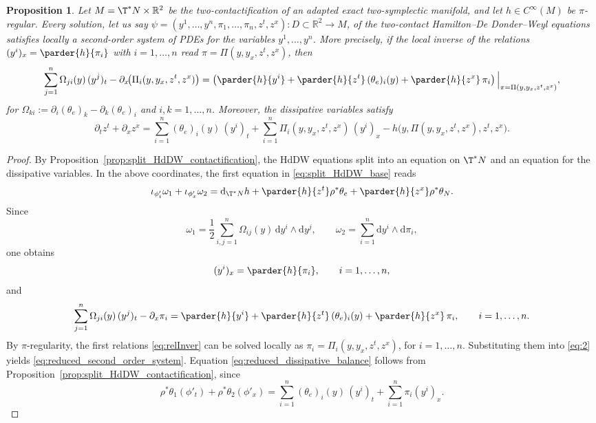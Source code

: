 \documentclass[11pt,a4paper]{article}
\newcommand{\dd}{\mathrm{d}}
\theoremstyle{plain} \newtheorem{theorem}{Theorem}[section] \newtheorem{proposition}[theorem]{Proposition} \newtheorem{corollary}[theorem]{Corollary} \newtheorem{lemma}[theorem]{Lemma} \theoremstyle{definition} \newtheorem{definition}[theorem]{Definition} \theoremstyle{remark} \newtheorem{remark}[theorem]{Remark} \newtheorem{example}[theorem]{Example} %
\begin{document}
\begin{proposition}\label{prop:reduced_second_order_equations}
Let \(M=\T^*N\times\mathbb R^2\) be the two-contactification of an adapted exact two-symplectic manifold, and let \(h\in C^\infty(M)\) be \(\pi\)-regular. Every solution, let us say \(\psi=(y^1,\dots,y^n,\pi_1,\dots,\pi_n,z^t,z^x):D\subset\mathbb R^2\to M\), of the two-contact Hamilton--De Donder--Weyl equations satisfies locally a second-order system of PDEs for the variables \(y^1,\dots,y^n\). More precisely, if the local inverse of the relations \((y^i)_x=\parder{h}{\pi_i}\) with \(i=1,\dots,n\) read \(\pi=\Pi(y,y_x,z^t,z^x)\), then
\begin{equation}\label{eq:reduced_second_order_system}
\sum_{j=1}^n \Omega_{ji}(y)\,(y^j)_t-\partial_x\!\bigl(\Pi_i(y,y_x,z^t,z^x)\bigr)=\left(\parder{h}{y^i}+\parder{h}{z^t}\,(\theta_e)_i(y)+\parder{h}{z^x}\,\pi_i\right)\Big|_{\pi=\Pi(y,y_x,z^t,z^x)},
\end{equation}
for  \(\Omega_{ki}:=\partial_i(\theta_e)_k-\partial_k(\theta_e)_i\) and $i,k=1,\dots,n$. Moreover, the dissipative variables satisfy
\begin{equation}\label{eq:reduced_dissipative_balance}
\partial_t z^t+\partial_x z^x=\sum_{i=1}^n (\theta_e)_i(y)\,(y^i)_t+\sum_{i=1}^n \Pi_i(y,y_x,z^t,z^x)\,(y^i)_x-h\bigl(y,\Pi(y,y_x,z^t,z^x),z^t,z^x\bigr).
\end{equation}
\end{proposition}

\begin{proof}
By Proposition~\ref{prop:split_HdDW_contactification}, the HdDW equations split into an equation on \(\T^*N\) and an equation for the dissipative variables. In the above coordinates, the first equation  in \eqref{eq:split_HdDW_base} reads
\[
\iota_{\phi'_t}\omega_1+\iota_{\phi'_x}\omega_2=\dd_{\T^*N}h+\parder{h}{z^t}\rho^*\theta_e+\parder{h}{z^x}\rho^*\theta_N.
\]
Since
\[
\omega_1=\frac12\sum_{i,j=1}^n \Omega_{ij}(y)\,\dd y^i\wedge\dd y^j,\qquad
\omega_2=\sum_{i=1}^n \dd y^i\wedge\dd\pi_i,
\]
one obtains
\begin{equation}\label{eq:relInver}
(y^i)_x=\parder{h}{\pi_i},\qquad i=1,\dots,n,
\end{equation}
and
\begin{equation}\label{eq:2}
\sum_{j=1}^n \Omega_{ji}(y)\,(y^j)_t-\partial_x\pi_i=\parder{h}{y^i}+\parder{h}{z^t}\,(\theta_e)_i(y)+\parder{h}{z^x}\,\pi_i,\qquad i=1,\dots,n.
\end{equation}
By \(\pi\)-regularity, the first relations \eqref{eq:relInver} can be solved locally as \(\pi_i=\Pi_i(y,y_x,z^t,z^x)\), for \(i=1,\dots,n\). Substituting them into  \eqref{eq:2} yields \eqref{eq:reduced_second_order_system}. Equation \eqref{eq:reduced_dissipative_balance} follows from Proposition~\ref{prop:split_HdDW_contactification}, since
\[
\rho^*\theta_1(\phi'_t)+\rho^*\theta_2(\phi'_x)=\sum_{i=1}^n (\theta_e)_i(y)\,(y^i)_t+\sum_{i=1}^n \pi_i (y^i)_x.
\]
\end{proof} 
\end{document}
